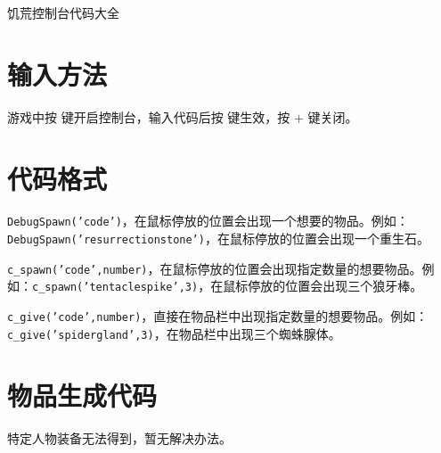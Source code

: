 \documentclass{myarticle}
\begin{document}
\begin{center}
 \Large \textsf{饥荒控制台代码大全}
\end{center}
\section*{输入方法}
游戏中按
\hspace{-0.3em}键开启控制台，输入代码后按
\hspace{-0.3em}键生效，按%
+
\hspace{-0.3em}键关闭。

\section*{代码格式}
\texttt{DebugSpawn('code')}，在鼠标停放的位置会出现一个想要的物品。例如：\texttt{DebugSpawn('resurrectionstone')}，在鼠标停放的位置会出现一个重生石。

\texttt{c\_spawn('code',number)}，在鼠标停放的位置会出现指定数量的想要物品。例如：\texttt{c\_spawn('tentaclespike',3)}，在鼠标停放的位置会出现三个狼牙棒。

\texttt{c\_give('code',number)}，直接在物品栏中出现指定数量的想要物品。例如：\texttt{c\_give('spidergland',3)}，在物品栏中出现三个蜘蛛腺体。

\section*{物品生成代码}
特定人物装备无法得到，暂无解决办法。

\centering
\end{document}
